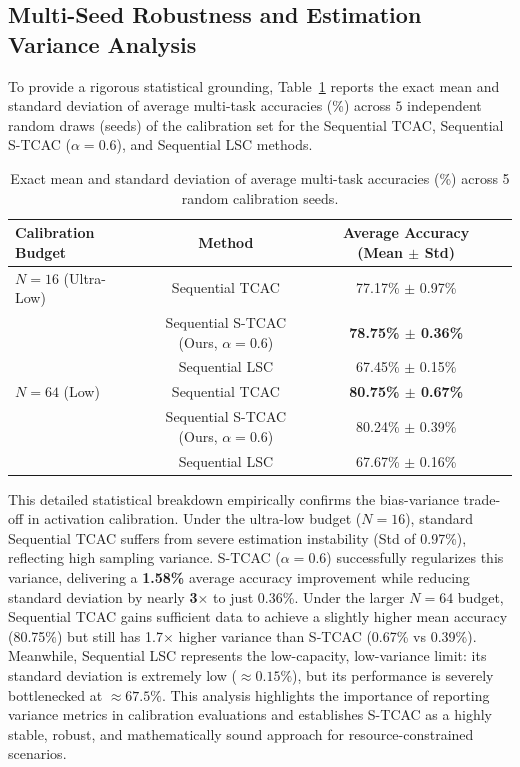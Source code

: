 \documentclass{article}
\theoremstyle{plain}
\theoremstyle{definition}
\theoremstyle{remark}
\begin{document}
\subsection{Multi-Seed Robustness and Estimation Variance Analysis}
To provide a rigorous statistical grounding, Table~\ref{tab:numerical_variance} reports the exact mean and standard deviation of average multi-task accuracies (\%) across $5$ independent random draws (seeds) of the calibration set for the Sequential TCAC, Sequential S-TCAC ($\alpha=0.6$), and Sequential LSC methods.

\begin{table}[ht]
\caption{Exact mean and standard deviation of average multi-task accuracies (\%) across 5 random calibration seeds.}
\label{tab:numerical_variance}
\vskip 0.15in
\begin{center}
\begin{small}
\begin{sc}
\begin{tabular}{lccc}
\toprule
Calibration Budget & Method & Average Accuracy (Mean $\pm$ Std) \\
\midrule
$N=16$ (Ultra-Low) & Sequential TCAC & 77.17\% $\pm$ 0.97\% \\
                   & Sequential S-TCAC (Ours, $\alpha=0.6$) & \textbf{78.75\% $\pm$ 0.36\%} \\
                   & Sequential LSC & 67.45\% $\pm$ 0.15\% \\
\midrule
$N=64$ (Low)       & Sequential TCAC & \textbf{80.75\% $\pm$ 0.67\%} \\
                   & Sequential S-TCAC (Ours, $\alpha=0.6$) & 80.24\% $\pm$ 0.39\% \\
                   & Sequential LSC & 67.67\% $\pm$ 0.16\% \\
\bottomrule
\end{tabular}
\end{sc}
\end{small}
\end{center}
\vskip -0.1in
\end{table}

This detailed statistical breakdown empirically confirms the bias-variance trade-off in activation calibration. Under the ultra-low budget ($N=16$), standard Sequential TCAC suffers from severe estimation instability (Std of 0.97\%), reflecting high sampling variance. S-TCAC ($\alpha=0.6$) successfully regularizes this variance, delivering a \textbf{1.58\%} average accuracy improvement while reducing standard deviation by nearly \textbf{3$\times$} to just 0.36\%. Under the larger $N=64$ budget, Sequential TCAC gains sufficient data to achieve a slightly higher mean accuracy (80.75\%) but still has 1.7$\times$ higher variance than S-TCAC (0.67\% vs 0.39\%). Meanwhile, Sequential LSC represents the low-capacity, low-variance limit: its standard deviation is extremely low ($\approx 0.15\%$), but its performance is severely bottlenecked at $\approx 67.5\%$. This analysis highlights the importance of reporting variance metrics in calibration evaluations and establishes S-TCAC as a highly stable, robust, and mathematically sound approach for resource-constrained scenarios.
\end{document}
